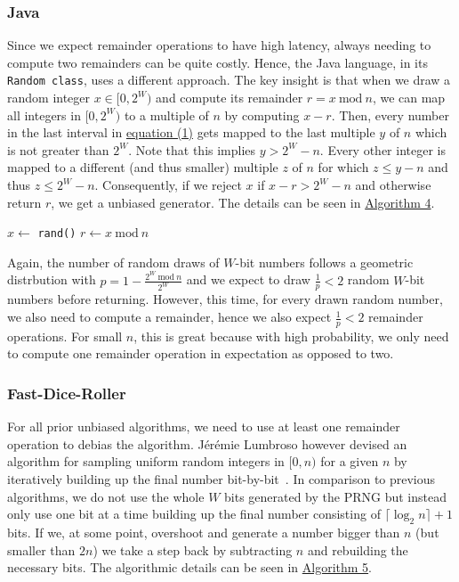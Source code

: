 \documentclass[a4paper, UKenglish, cleveref, autoref, thm-restate]{lipics-v2021}
\newcommand{\Mod}[1]{\ \mathrm{mod}\ #1}
\begin{document}
\subsubsection{Java}\label{sec:2.2.2}
Since we expect remainder operations to have high latency, always needing to compute two remainders can be quite costly.
Hence, the Java language, in its \texttt{Random class}, uses a different approach.
The key insight is that when we draw a random integer $x \in [0,2^W)$ and compute its remainder $r = x \Mod n$, we can map all integers in $[0,2^W)$ to a multiple of $n$ by computing $x - r$.
Then, every number in the last interval in \hyperref[eq:1]{equation (1)} gets mapped to the last multiple $y$ of $n$ which is not greater than $2^W$.
Note that this implies $y > 2^W - n$.
Every other integer is mapped to a different (and thus smaller) multiple $z$ of $n$ for which $z \leq y - n$ and thus $z \leq 2^W - n$.
Consequently, if we reject $x$ if $x - r > 2^W - n$ and otherwise return $r$, we get a unbiased generator.
The details can be seen in \hyperref[alg:java]{Algorithm 4}.

\begin{algorithm}[!htb] \label{alg:java}
    \caption{The Java algorithm.}
    \Require{source of uniformly-distributed random integers in $[0,2^W)$ given by \texttt{rand()}}
    $x \leftarrow$ \texttt{rand()}\;
    $r \leftarrow x \Mod n$\;
    \While{$x - r > 2^W - n$}{
        $x \leftarrow$ \texttt{rand()}\;
        $r \leftarrow x \Mod n$\;
    }
    \;
\end{algorithm}

Again, the number of random draws of $W$-bit numbers follows a geometric distrbution with $p = 1 - \frac{2^W \Mod n}{2^W}$ and we expect to draw $\frac{1}{p} < 2$ random $W$-bit numbers before returning.
However, this time, for every drawn random number, we also need to compute a remainder, hence we also expect $\frac{1}{p} < 2$ remainder operations.
For small $n$, this is great because with high probability, we only need to compute one remainder operation in expectation as opposed to two.

\subsubsection{Fast-Dice-Roller}\label{sec:2.2.3}
For all prior unbiased algorithms, we need to use at least one remainder operation to debias the algorithm.
Jérémie Lumbroso however devised an algorithm for sampling uniform random integers in $[0,n)$ for a given $n$ by iteratively building up the final number bit-by-bit~\cite{Flips}.
In comparison to previous algorithms, we do not use the whole $W$ bits generated by the PRNG but instead only use one bit at a time building up the final number consisting of $\lceil\log_2n\rceil + 1$ bits.
If we, at some point, overshoot and generate a number bigger than $n$ (but smaller than $2n$) we take a step back by subtracting $n$ and rebuilding the necessary bits.
The algorithmic details can be seen in \hyperref[alg:flips]{Algorithm 5}.
\end{document}
